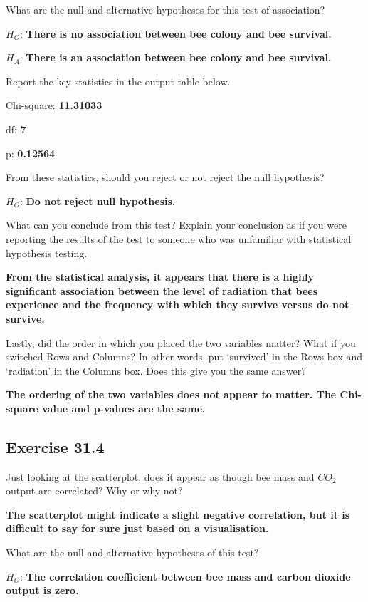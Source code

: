 \documentclass[
  openany]{krantz}
\begin{document}
What are the null and alternative hypotheses for this test of association?

\(H_{O}\): \textbf{There is no association between bee colony and bee survival.}

\(H_{A}\): \textbf{There is an association between bee colony and bee survival.}

Report the key statistics in the output table below.

Chi-square: \textbf{11.31033}

df: \textbf{7}

p: \textbf{0.12564}

From these statistics, should you reject or not reject the null hypothesis?

\(H_{O}\): \textbf{Do not reject null hypothesis.}

What can you conclude from this test? Explain your conclusion as if you were reporting the results of the test to someone who was unfamiliar with statistical hypothesis testing.

\textbf{From the statistical analysis, it appears that there is a highly significant association between the level of radiation that bees experience and the frequency with which they survive versus do not survive.}

Lastly, did the order in which you placed the two variables matter? What if you switched Rows and Columns? In other words, put `survived' in the Rows box and `radiation' in the Columns box. Does this give you the same answer?

\textbf{The ordering of the two variables does not appear to matter. The Chi-square value and p-values are the same.}

\hypertarget{exercise-31.4}{%
\subsection{Exercise 31.4}\label{exercise-31.4}}

Just looking at the scatterplot, does it appear as though bee mass and \(CO_{2}\) output are correlated? Why or why not?

\textbf{The scatterplot might indicate a slight negative correlation, but it is difficult to say for sure just based on a visualisation.}

What are the null and alternative hypotheses of this test?

\(H_{O}\): \textbf{The correlation coefficient between bee mass and carbon dioxide output is zero.}
\end{document}
